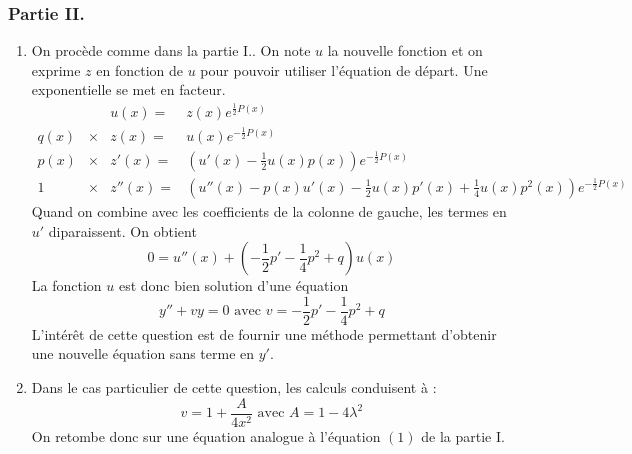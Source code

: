 \subsubsection*{Partie II.}
\begin{enumerate}
 \item On procède comme dans la partie I.. On note $u$ la nouvelle fonction et on exprime $z$ en fonction de $u$ pour pouvoir utiliser l'équation de départ. Une exponentielle se met en facteur.
\begin{align*}
& & u(x)=& z(x)e^{\frac{1}{2}P(x)}\\
q(x) & \times& z(x) =& u(x)e^{-\frac{1}{2}P(x)}\\
p(x) & \times& z'(x) =& \left( u'(x)-\frac{1}{2}u(x)p(x) \right) e^{-\frac{1}{2}P(x)}\\
1 & \times& z''(x) =& \left( u''(x)-p(x)u'(x)-\frac{1}{2}u(x)p'(x) +\frac{1}{4}u(x)p^2(x)\right) e^{-\frac{1}{2}P(x)}
\end{align*}
Quand on combine avec les coefficients de la colonne de gauche, les termes en $u'$ diparaissent. On obtient
\begin{displaymath}
 0 = u''(x) +(-\frac{1}{2}p'-\frac{1}{4}p^2+q)u(x)
\end{displaymath}
La fonction $u$ est donc bien solution d'une équation
\begin{displaymath}
 y'' +vy=0 \text{ avec } v = -\frac{1}{2}p'-\frac{1}{4}p^2+q
\end{displaymath}
L'intérêt de cette question est de fournir une méthode permettant d'obtenir une nouvelle équation sans terme en $y'$.
\item Dans le cas particulier de cette question, les calculs conduisent à :
\begin{displaymath}
 v= 1 + \frac{A}{4x^2} \text{ avec }  A = 1-4\lambda^2
\end{displaymath}
On retombe donc sur une équation analogue à l'équation $(1)$ de la partie I.
\end{enumerate}
